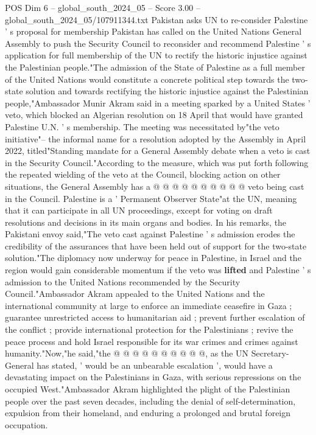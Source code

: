 \begin{textsample}{POS Dim 6 – global\_south\_2024\_05 – Score 3.00 – global\_south\_2024\_05/107911344.txt}  \label{ex:f6_pos_220}
Pakistan asks UN to re-consider Palestine ' s proposal for membership Pakistan has called on the United Nations General Assembly to push the Security Council to reconsider and recommend Palestine ' s application for full membership of the UN to rectify the historic injustice against the Palestinian people."The admission of the State of Palestine as a full member of the United Nations would constitute a concrete political step towards the two-state solution and towards rectifying the historic injustice against the Palestinian people,"Ambassador Munir Akram said in a meeting sparked by a United States ' veto, which blocked an Algerian resolution on 18 April that would have granted Palestine U.N. ' s membership.
The meeting was necessitated by"the veto initiative"-- the informal name for a resolution adopted by the Assembly in April 2022, titled"Standing mandate for a General Assembly debate when a veto is cast in the Security Council."According to the measure, which was put forth following the repeated wielding of the veto at the Council, blocking action on other situations, the General Assembly has a @ @ @ @ @ @ @ @ @ @ veto being cast in the Council.
Palestine is a ' Permanent Observer State"at the UN, meaning that it can participate in all UN proceedings, except for voting on draft resolutions and decisions in its main organs and bodies.
In his remarks, the Pakistani envoy said,"The veto cast against Palestine ' s admission erodes the credibility of the assurances that have been held out of support for the two-state solution."The diplomacy now underway for peace in Palestine, in Israel and the region would gain considerable momentum if the veto was \textbf{lifted} and Palestine ' s admission to the United Nations recommended by the Security Council."Ambassador Akram appealed to the United Nations and the international community at large to enforce an immediate ceasefire in Gaza ; guarantee unrestricted access to humanitarian aid ; prevent further escalation of the conflict ; provide international protection for the Palestinians ; revive the peace process and hold Israel responsible for its war crimes and crimes against humanity."Now,"he said,"the @ @ @ @ @ @ @ @ @ @, as the UN Secretary-General has stated, ' would be an unbearable escalation ', would have a devastating impact on the Palestinians in Gaza, with serious repressions on the occupied West."Ambassador Akram highlighted the plight of the Palestinian people over the past seven decades, including the denial of self-determination, expulsion from their homeland, and enduring a prolonged and brutal foreign occupation.

\end{textsample}
